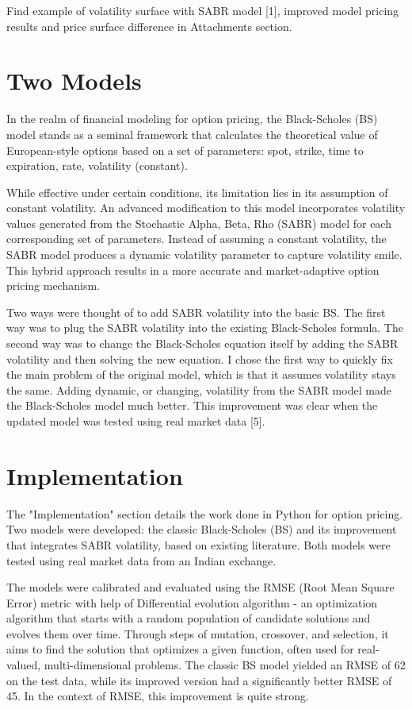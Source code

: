 \documentclass[a4paper,fleqn,12pt]{extarticle}
\begin{document}
	Find example of volatility surface with SABR model [1], improved model pricing results and price surface difference in Attachments section.

	
	\newpage
	\section{Two Models}

	In the realm of financial modeling for option pricing, the Black-Scholes (BS) model stands as a seminal framework that calculates the theoretical value of European-style options based on a set of parameters: spot, strike, time to expiration, rate, volatility (constant).
	
	While effective under certain conditions, its limitation lies in its assumption of constant volatility. An advanced modification to this model incorporates volatility values generated from the Stochastic Alpha, Beta, Rho (SABR) model for each corresponding set of parameters. Instead of assuming a constant volatility, the SABR model produces a dynamic volatility parameter to capture volatility smile. This hybrid approach results in a more accurate and market-adaptive option pricing mechanism.

	Two ways were thought of to add SABR volatility into the basic BS. The first way was to plug the SABR volatility into the existing Black-Scholes formula. The second way was to change the Black-Scholes equation itself by adding the SABR volatility and then solving the new equation. I chose the first way to quickly fix the main problem of the original model, which is that it assumes volatility stays the same. Adding dynamic, or changing, volatility from the SABR model made the Black-Scholes model much better. This improvement was clear when the updated model was tested using real market data [5].


	\newpage
	\section{Implementation}
	
	The "Implementation" section details the work done in Python for option pricing. Two models were developed: the classic Black-Scholes (BS) and its improvement that integrates SABR volatility, based on existing literature. Both models were tested using real market data from an Indian exchange. 
	
	The models were calibrated and evaluated using the RMSE (Root Mean Square Error) metric with help of Differential evolution algorithm - an optimization algorithm that starts with a random population of candidate solutions and evolves them over time. Through steps of mutation, crossover, and selection, it aims to find the solution that optimizes a given function, often used for real-valued, multi-dimensional problems. The classic BS model yielded an RMSE of 62 on the test data, while its improved version had a significantly better RMSE of 45. In the context of RMSE, this improvement is quite strong.
\end{document}
